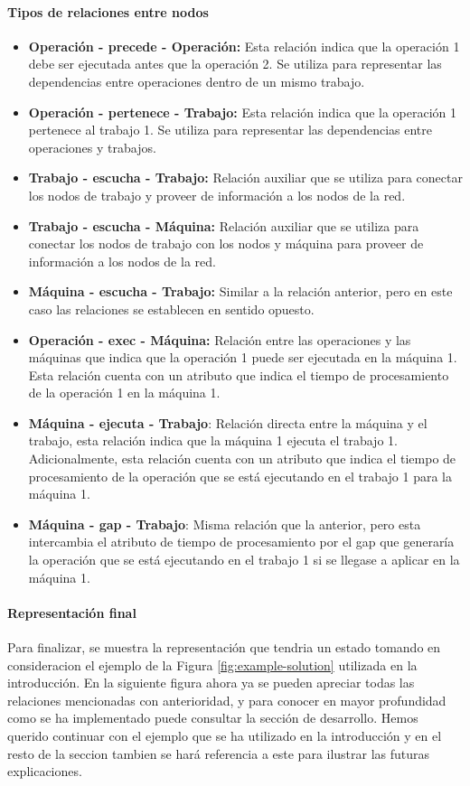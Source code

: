 \paragraph{Tipos de relaciones entre nodos}
\begin{itemize}
    \item \textbf{Operación - precede - Operación:} Esta relación indica que la operación 1 debe ser
    ejecutada antes que la operación 2. Se utiliza para representar las dependencias entre operaciones
    dentro de un mismo trabajo.
    \item \textbf{Operación - pertenece - Trabajo:} Esta relación indica que la operación 1 pertenece
    al trabajo 1. Se utiliza para representar las dependencias entre operaciones y trabajos.
    \item \textbf{Trabajo - escucha - Trabajo:} Relación auxiliar que se utiliza para conectar los
    nodos de trabajo y proveer de información a los nodos de la red.
    \item \textbf{Trabajo - escucha - Máquina:} Relación auxiliar que se utiliza para conectar los
    nodos de trabajo con los nodos y máquina para proveer de información a los nodos de la red.
    \item \textbf{Máquina - escucha - Trabajo:} Similar a la relación anterior, pero en este caso
    las relaciones se establecen en sentido opuesto.
    \item \textbf{Operación - exec - Máquina:} Relación entre las operaciones y las máquinas que indica
    que la operación 1 puede ser ejecutada en la máquina 1. Esta relación cuenta con un atributo que
    indica el tiempo de procesamiento de la operación 1 en la máquina 1.
    \item \textbf{Máquina - ejecuta - Trabajo}: Relación directa entre la máquina y el trabajo, esta
    relación indica que la máquina 1 ejecuta el trabajo 1. Adicionalmente, esta relación cuenta con
    un atributo que indica el tiempo de procesamiento de la operación que se está ejecutando en el
    trabajo 1 para la máquina 1.
    \item \textbf{Máquina - gap - Trabajo}: Misma relación que la anterior, pero esta intercambia el
    atributo de tiempo de procesamiento por el gap que generaría la operación que se está ejecutando
    en el trabajo 1 si se llegase a aplicar en la máquina 1.
\end{itemize}

\paragraph{Representación final}
Para finalizar, se muestra la representación que tendria un estado tomando en consideracion el ejemplo 
de la Figura \ref{fig:example-solution} utilizada en la introducción. En la siguiente figura ahora ya 
se pueden apreciar todas las relaciones mencionadas con anterioridad, y para conocer en mayor profundidad
como se ha implementado puede consultar la sección de desarrollo. Hemos querido continuar con el ejemplo
que se ha utilizado en la introducción y en el resto de la seccion tambien se hará referencia a este
para ilustrar las futuras explicaciones. 

